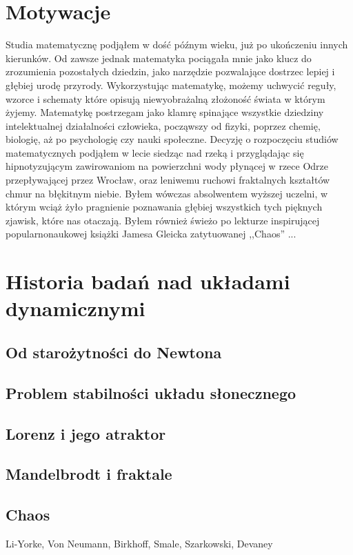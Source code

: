 \documentclass[licencjacka]{pwr_wmat_praca_dyplomowa}
\theoremstyle{plain}
\numberwithin{theorem}{chapter}
\theoremstyle{definition}
\numberwithin{theorem}{chapter}
\begin{document}
\section{Motywacje}
Studia matematycznę podjąłem w dość późnym wieku, już po ukończeniu innych kierunków. Od zawsze jednak matematyka pociągała mnie jako klucz do zrozumienia pozostałych dziedzin, jako narzędzie pozwalające dostrzec lepiej i głębiej urodę przyrody. Wykorzystując matematykę, możemy uchwycić reguły, wzorce i schematy które opisują niewyobrażalną złożoność świata w którym żyjemy. Matematykę postrzegam jako klamrę spinające wszystkie dziedziny intelektualnej działalności człowieka, począwszy od fizyki, poprzez chemię, biologię, aż po psychologię czy nauki społeczne. Decyzję o rozpoczęciu studiów matematycznych podjąłem w lecie siedząc nad rzeką i przyglądając się hipnotyzującym zawirowaniom na powierzchni wody płynącej w rzece Odrze przepływającej przez Wrocław, oraz leniwemu ruchowi fraktalnych kształtów chmur na błękitnym niebie. Byłem wówczas absolwentem wyższej uczelni, w którym wciąż żyło pragnienie poznawania głębiej wszystkich tych pięknych zjawisk, które nas otaczają. Byłem również świeżo po lekturze inspirującej popularnonaukowej książki Jamesa Gleicka zatytuowanej ,,Chaos'' \cite{gleick1987chaos}...
\section{Historia badań nad układami dynamicznymi}
\subsection{Od starożytności do Newtona}
\subsection{Problem stabilności układu słonecznego}
\subsection{Lorenz i jego atraktor}
\subsection{Mandelbrodt i fraktale}
\subsection{Chaos}
Li-Yorke, Von Neumann, Birkhoff, Smale, Szarkowski, Devaney
\end{document}
